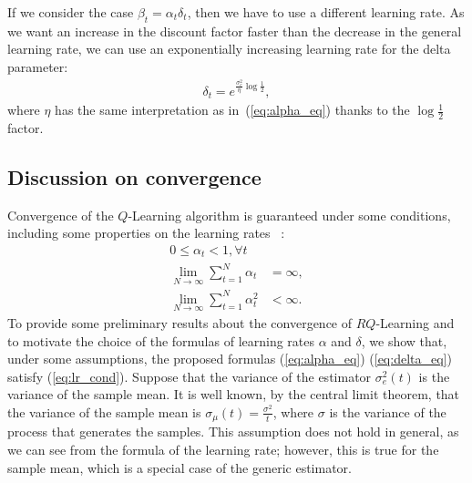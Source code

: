 If we consider the case $\beta_t=\alpha_t\delta_t$, then we have to use a different learning rate. As we want an increase in the discount factor faster than the decrease in the general learning rate, we can use an exponentially increasing learning rate for the delta parameter:
\begin{align}\label{eq:delta_eq}
 \delta_t = e^{\frac{\sigma_e^2}{\eta}\log\frac{1}{2}},
\end{align}
where $\eta$ has the same interpretation as in~(\ref{eq:alpha_eq}) thanks to the $\log\frac{1}{2}$ factor.

\subsection{Discussion on convergence}
Convergence of the $Q$-Learning algorithm is guaranteed under some conditions, including some properties on the learning rates ~\cite{EvenDar2001, watkins1989learning}:
\begin{align}
 0 \leq \alpha_t < 1, \forall t\nonumber \\
 \lim_{N\rightarrow\infty} \sum_{t=1}^{N}\alpha_t & = \infty,\nonumber \\
 \lim_{N\rightarrow\infty} \sum_{t=1}^{N}\alpha_t^2 & < \infty. \label{eq:lr_cond}
\end{align}
To provide some preliminary results about the convergence of $RQ$-Learning and to motivate the choice of the formulas of learning rates $\alpha$ and $\delta$, we show that, under some assumptions, the proposed formulas (\ref{eq:alpha_eq}) (\ref{eq:delta_eq}) satisfy (\ref{eq:lr_cond}). Suppose that the variance of the estimator $\sigma_e^2(t)$ is the variance of the sample mean. It is well known, by the central limit theorem, that the variance of the sample mean is $\sigma_{\mu}(t)=\frac{\sigma^2}{t}$, where $\sigma$ is the variance of the process that generates the samples.
This assumption does not hold in general, as we can see from the formula of the learning rate; however, this is true for the sample mean, which is a special case of the generic estimator.

